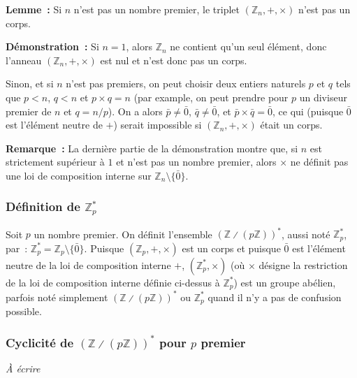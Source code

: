 \done

\medskip

\noindent\textbf{Lemme :} Si $n$ n'est pas un nombre premier, le triplet $\left( \mathbb{Z}_n, +, \times \right)$ n'est pas un corps. 

\medskip

\noindent\textbf{Démonstration :} 
    Si $n = 1$, alors $\mathbb{Z}_n$ ne contient qu'un seul élément, donc l'anneau $\left(\mathbb{Z}_n, +, \times \right)$ est nul et n'est donc pas un corps.

    Sinon, et si $n$ n'est pas premiers, on peut choisir deux entiers naturels $p$ et $q$ tels que $p < n$, $q < n$ et $p \times q = n$ (par example, on peut prendre pour $p$ un diviseur premier de $n$ et $q = n / p$).
    On a alors $\bar{p} \neq \bar{0}$, $\bar{q} \neq \bar{0}$, et $\bar{p} \times \bar{q} = \bar{0}$, ce qui (puisque $\bar{0}$ est l'élément neutre de $+$) serait impossible si $\left(\mathbb{Z}_n, +, \times \right)$ était un corps. 

    \done

\medskip

\noindent\textbf{Remarque :} La dernière partie de la démonstration montre que, si $n$ est strictement supérieur à $1$ et n'est pas un nombre premier, alors $\times$ ne définit pas une loi de composition interne sur $\mathbb{Z}_n \setminus \lbrace \bar{0} \rbrace$.

\subsubsection{Définition de \texorpdfstring{$\mathbb{Z}_p^*$}{Zp*}}

Soit $p$ un nombre premier. 
On définit l'ensemble $\left( \mathbb{Z} \divslash (p \mathbb{Z}) \right)^*$, aussi noté $\mathbb{Z}_p^*$, par : $\mathbb{Z}_p^* = \mathbb{Z}_p \setminus \lbrace \bar{0} \rbrace$.
Puisque $\left(\mathbb{Z}_p, +, \times \right)$ est un corps et puisque $\bar{0}$ est l'élément neutre de la loi de composition interne $+$, $\left( \mathbb{Z}_p^*, \times \right)$ (où $\times$ désigne la restriction de la loi de composition interne définie ci-dessus à $\mathbb{Z}_p^*$) est un groupe abélien, parfois noté simplement $\left( \mathbb{Z} \divslash (p \mathbb{Z}) \right)^*$ ou $\mathbb{Z}_p^*$ quand il n'y a pas de confusion possible.

\subsubsection{Cyclicité de \texorpdfstring{$\left( \mathbb{Z} \divslash (p \mathbb{Z}) \right)^*$}{(Z / p Z)*} pour \texorpdfstring{$p$}{p} premier}
\label{subsubsec:cyclicity_Z_pZ}

\textit{À écrire}
